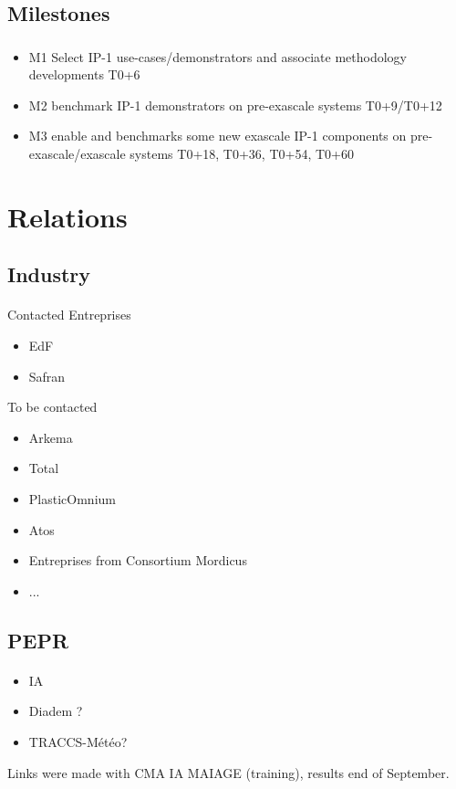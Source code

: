 \subsection{Milestones}

\begin{frame}
  \frametitle{\insertsectionhead}
  \framesubtitle{\insertsubsectionhead}
  \begin{itemize}
      \item   M1 Select IP-1 use-cases/demonstrators and associate methodology developments T0+6
\item M2 benchmark IP-1 demonstrators on pre-exascale systems T0+9/T0+12
\item M3 enable and benchmarks some new exascale  IP-1 components on pre-exascale/exascale systems T0+18, T0+36, T0+54, T0+60
  \end{itemize}


\end{frame}

\section{Relations}
\subsection{Industry}
\begin{frame}{\insertsectionhead}
  \framesubtitle{\insertsubsectionhead}
Contacted Entreprises
\begin{itemize}
    \item EdF
    \item Safran
\end{itemize}
To be contacted
\begin{itemize}
    \item Arkema
    \item Total
    \item PlasticOmnium
    \item Atos
    \item Entreprises from Consortium Mordicus
    \item ...
\end{itemize}
\end{frame}

\subsection{PEPR}
\begin{frame}{\insertsectionhead}
  \framesubtitle{\insertsubsectionhead}

\begin{itemize}
    \item IA
    \item Diadem ?
    \item TRACCS-Météo?
\end{itemize}

Links were made with CMA IA MAIAGE (training), results end of September.
\end{frame}

